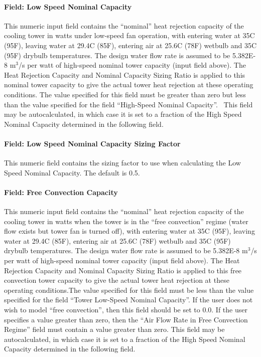 \paragraph{Field: Low Speed Nominal Capacity}\label{field-low-speed-nominal-capacity}

This numeric input field contains the ``nominal'' heat rejection capacity of the cooling tower in watts under low-speed fan operation, with entering water at 35C (95F), leaving water at 29.4C (85F), entering air at 25.6C (78F) wetbulb and 35C (95F) drybulb temperatures. The design water flow rate is assumed to be 5.382E-8 m\(^{3}\)/s per watt of high-speed nominal tower capacity (input field above). The Heat Rejection Capacity and Nominal Capacity Sizing Ratio is applied to this nominal tower capacity to give the actual tower heat rejection at these operating conditions. The value specified for this field must be greater than zero but less than the value specified for the field ``High-Speed Nominal Capacity''.~ This field may be autocalculated, in which case it is set to a fraction of the High Speed Nominal Capacity determined in the following field.

\paragraph{Field: Low Speed Nominal Capacity Sizing Factor}\label{field-low-speed-nominal-capacity-sizing-factor}

This numeric field contains the sizing factor to use when calculating the Low Speed Nominal Capacity. The default is 0.5.

\paragraph{Field: Free Convection Capacity}\label{field-free-convection-capacity-1}

This numeric input field contains the ``nominal'' heat rejection capacity of the cooling tower in watts when the tower is in the ``free convection'' regime (water flow exists but tower fan is turned off), with entering water at 35C (95F), leaving water at 29.4C (85F), entering air at 25.6C (78F) wetbulb and 35C (95F) drybulb temperatures. The design water flow rate is assumed to be 5.382E-8 m\(^{3}\)/s per watt of high-speed nominal tower capacity (input field above). The Heat Rejection Capacity and Nominal Capacity Sizing Ratio is applied to this free convection tower capacity to give the actual tower heat rejection at these operating conditions.The value specified for this field must be less than the value specified for the field ``Tower Low-Speed Nominal Capacity''. If the user does not wish to model ``free convection'', then this field should be set to 0.0. If the user specifies a value greater than zero, then the ``Air Flow Rate in Free Convection Regime'' field must contain a value greater than zero. This field may be autocalculated, in which case it is set to a fraction of the High Speed Nominal Capacity determined in the following field.

